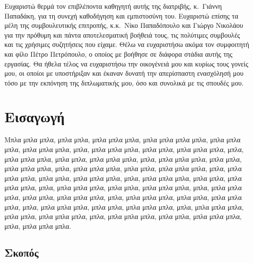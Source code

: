 \documentclass[diploma]{softlab-thesis}
\begin{document}

\begin{acknowledgementsgr}
Ευχαριστώ θερμά τον επιβλέποντα καθηγητή αυτής της διατριβής,
κ.~Γιάννη Παπαδάκη, για τη συνεχή καθοδήγηση και εμπιστοσύνη
του. Ευχαριστώ επίσης τα μέλη της συμβουλευτικής επιτροπής,
κ.κ.~Νίκο Παπαδόπουλο και Γιώργο Νικολάου για την πρόθυμη και
πάντα αποτελεσματική βοήθειά τους, τις πολύτιμες συμβουλές και
τις χρήσιμες συζητήσεις που είχαμε.  Θέλω να ευχαριστήσω ακόμα
τον συμφοιτητή και φίλο Πέτρο Πετρόπουλο, ο οποίος με βοήθησε σε
διάφορα στάδια αυτής της εργασίας.  Θα ήθελα τέλος να ευχαριστήσω
την οικογένειά μου και κυρίως τους γονείς μου, οι οποίοι με
υποστήριξαν και έκαναν δυνατή την απερίσπαστη ενασχόλησή μου τόσο
με την εκπόνηση της διπλωματικής μου, όσο και συνολικά με τις
σπουδές μου.
\end{acknowledgementsgr}



\tableofcontents
\listoftables
\listoffigures



\mainmatter

\chapter{Εισαγωγή}

Μπλα μπλα μπλα, μπλα μπλα, μπλα μπλα μπλα, μπλα μπλα μπλα μπλα,
μπλα μπλα μπλα, μπλα μπλα μπλα, μπλα, μπλα μπλα μπλα, μπλα μπλα,
μπλα μπλα μπλα, μπλα, μπλα μπλα μπλα, μπλα μπλα, μπλα μπλα μπλα,
μπλα, μπλα μπλα μπλα, μπλα μπλα, μπλα μπλα μπλα, μπλα, μπλα μπλα
μπλα, μπλα μπλα, μπλα μπλα μπλα, μπλα, μπλα μπλα μπλα, μπλα μπλα,
μπλα μπλα μπλα, μπλα, μπλα μπλα μπλα, μπλα μπλα, μπλα μπλα μπλα,
μπλα, μπλα μπλα μπλα, μπλα μπλα, μπλα μπλα μπλα, μπλα, μπλα μπλα
μπλα, μπλα μπλα, μπλα μπλα μπλα, μπλα, μπλα μπλα μπλα, μπλα μπλα,
μπλα μπλα μπλα, μπλα, μπλα μπλα μπλα, μπλα μπλα, μπλα μπλα μπλα,
μπλα, μπλα μπλα μπλα, μπλα μπλα, μπλα μπλα μπλα, μπλα, μπλα μπλα
μπλα, μπλα μπλα, μπλα μπλα μπλα, μπλα, μπλα μπλα μπλα.


\section{Σκοπός}
\end{document}
